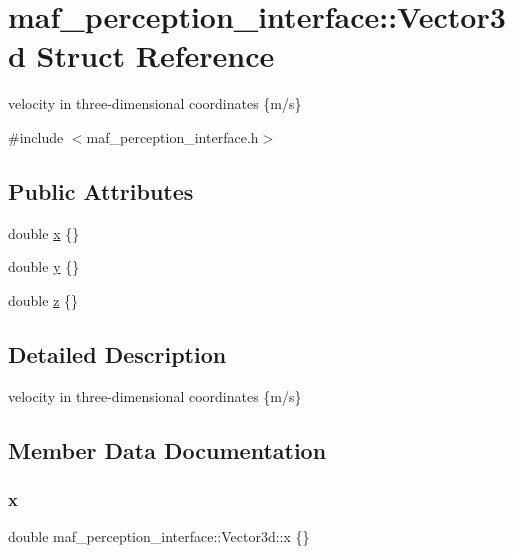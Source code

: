 \hypertarget{structmaf__perception__interface_1_1Vector3d}{}\section{maf\+\_\+perception\+\_\+interface\+:\+:Vector3d Struct Reference}
\label{structmaf__perception__interface_1_1Vector3d}


velocity in three-\/dimensional coordinates \{m/s\}  




{\ttfamily \#include $<$maf\+\_\+perception\+\_\+interface.\+h$>$}

\subsection*{Public Attributes}
\begin{DoxyCompactItemize}
\item 
double \hyperlink{structmaf__perception__interface_1_1Vector3d_af0f70afe6a8cc1870d53e813735b6421}{x} \{\}
\item 
double \hyperlink{structmaf__perception__interface_1_1Vector3d_a17434b462abac117af6fd003034ea50a}{y} \{\}
\item 
double \hyperlink{structmaf__perception__interface_1_1Vector3d_a747131ce52c62e6dc9544db4186c4830}{z} \{\}
\end{DoxyCompactItemize}


\subsection{Detailed Description}
velocity in three-\/dimensional coordinates \{m/s\} 

\subsection{Member Data Documentation}
\mbox{\label{structmaf__perception__interface_1_1Vector3d_af0f70afe6a8cc1870d53e813735b6421}} 
\subsubsection{\texorpdfstring{x}{x}}
{\footnotesize\ttfamily double maf\+\_\+perception\+\_\+interface\+::\+Vector3d\+::x \{\}}

